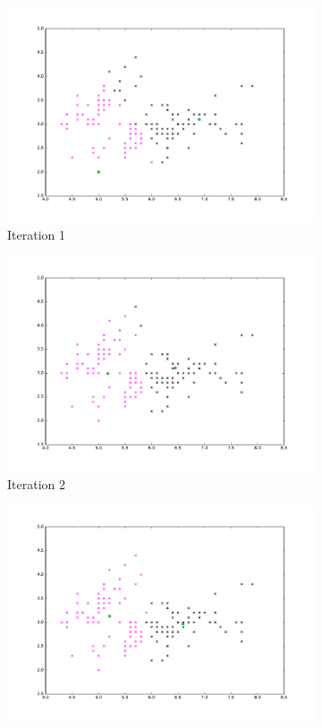 \begin{figure}[!h]
  \centering
  \begin{subfigure}{.3\textwidth}
    \centering
    \includegraphics[width=\linewidth]{figures/k-means_first_1_iteration.pdf}
    \caption{Iteration 1}
  \end{subfigure} %
  \begin{subfigure}{0.3\textwidth}
    \centering
    \includegraphics[width=\linewidth]{figures/k-means_first_2_iteration.pdf}
    \caption{Iteration 2}
  \end{subfigure}
	\begin{subfigure}{0.3\textwidth}
		\centering
		\includegraphics[width=\linewidth]{figures/k-means_first_5_iteration.pdf}

\end{subfigure}
\end{figure}
